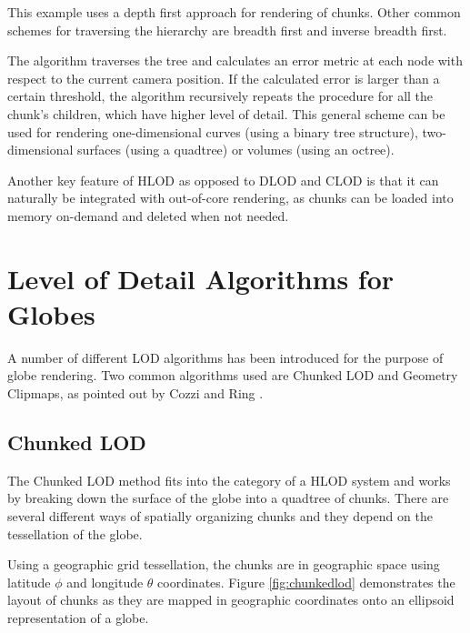 This example uses a depth first approach for rendering of chunks. Other common schemes for traversing the hierarchy are breadth first and inverse breadth first.

The algorithm traverses the tree and calculates an error metric at each node with respect to the current camera position. If the calculated error is larger than a certain threshold, the algorithm recursively repeats the procedure for all the chunk's children, which have higher level of detail. This general scheme can be used for rendering one-dimensional curves (using a binary tree structure), two-dimensional surfaces (using a quadtree) or volumes (using an octree).

Another key feature of HLOD as opposed to DLOD and CLOD is that it can naturally be integrated with out-of-core rendering, as chunks can be loaded into memory on-demand and deleted when not needed.



\section{Level of Detail Algorithms for Globes}
A number of different LOD algorithms has been introduced for the purpose of globe rendering. Two common algorithms used are Chunked LOD and Geometry Clipmaps, as pointed out by Cozzi and Ring \cite{cozzi11}.

\subsection{Chunked LOD}
\label{section:chunkedlodbacground}
The Chunked LOD method fits into the category of a HLOD system and works by breaking down the surface of the globe into a quadtree of chunks. There are several different ways of spatially organizing chunks and they depend on the tessellation of the globe. 

Using a geographic grid tessellation, the chunks are in geographic space using latitude $\phi$ and longitude $\theta$ coordinates. Figure \ref{fig:chunkedlod} demonstrates the layout of chunks as they are mapped in geographic coordinates onto an ellipsoid representation of a globe.

